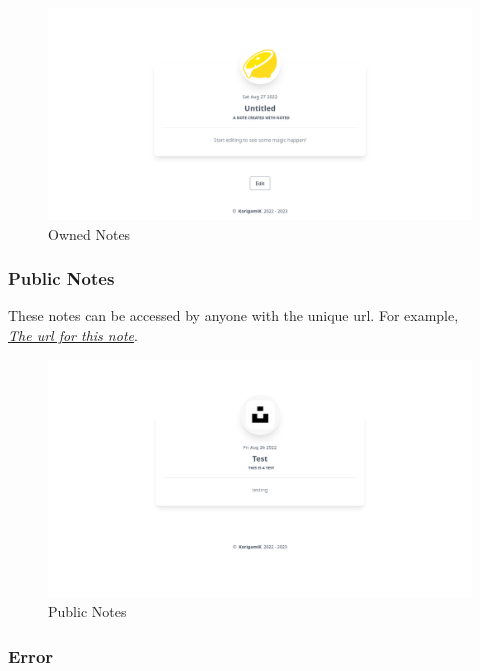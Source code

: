 \documentclass[
]{article}
\begin{document}
\begin{figure}[!h]
  \centering
  \includegraphics{../.github/images/ownedNote.png}
  \caption{Owned Notes}
\end{figure}

\hypertarget{public-notes}{%
  \subsubsection{Public Notes}\label{public-notes}
  These notes can be accessed by anyone with the unique url. For example,\\
  \href{https://noted.deno.dev/note/63090ba0f680d16e0785c984b2b4c0017b0b2b2}{\textit{The url for this note}}.
}

\begin{figure}[!h]
  \centering
  \includegraphics{../.github/images/publicNote.png}
  \caption{Public Notes}
\end{figure}

\hypertarget{error}{%
  \pagebreak
  \subsubsection{Error}\label{error}}
\end{document}
